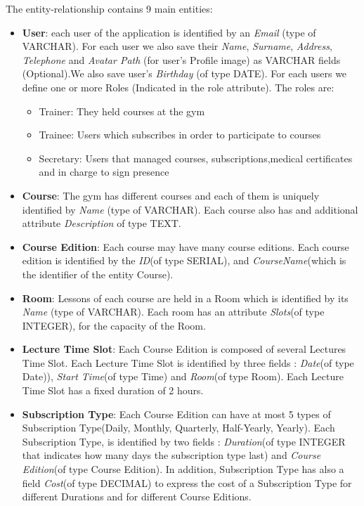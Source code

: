    The entity-relationship contains 9 main entities:
    \begin{itemize}
        \item 
        \textbf{User}: each user of the application is identified by an \textit{Email} (type of VARCHAR). 
    	For each user we also save their \textit{Name}, \textit{Surname}, \textit{Address}, \textit{Telephone} and \textit{Avatar Path} (for user's Profile image) as VARCHAR fields (Optional).We also save user's \textit{Birthday} (of type DATE). For each users we define
        one or more Roles (Indicated in the role attribute). The roles are:
        \begin{itemize}
			\item Trainer: They held courses at the gym 
			\item Trainee: Users which subscribes in order to participate to courses
			\item Secretary: Users that managed courses, subscriptions,medical certificates and in charge to sign presence
        \end{itemize}
    	
    	\item \textbf{Course}: The gym has different courses and each of them is uniquely identified by \textit{Name} (type of VARCHAR). Each course also has and additional attribute \textit{Description} of type TEXT.
    	
    	\item \textbf{Course Edition}: Each course may have many course editions. Each course edition is identified by the \textit{ID}(of type SERIAL), and \textit{CourseName}(which is the identifier of the entity Course).
    	
    	\item \textbf{Room}: Lessons of each course are held in a Room which is identified by its \textit{Name} (type of VARCHAR). Each room has an attribute \textit{Slots}(of type INTEGER), for the capacity of the Room.
    	
    	\item \textbf{Lecture Time Slot}: Each Course Edition is composed of several Lectures Time Slot. Each Lecture Time Slot is identified by three fields : \textit{Date}(of type Date)), \textit{Start Time}(of type Time) and \textit{Room}(of type Room). Each Lecture Time Slot has a fixed duration of 2 hours.
    	
    	\item \textbf{Subscription Type}: Each Course Edition can have at most 5 types of Subscription Type(Daily, Monthly, Quarterly, Half-Yearly, Yearly). Each Subscription Type, is identified by two fields : \textit{Duration}(of type INTEGER that indicates how many days the subscription type last) and \textit{Course Edition}(of type Course Edition). In addition, Subscription Type has also a field \textit{Cost}(of type DECIMAL) to express the cost of a Subscription Type for different Durations and for different Course Editions.
    	

\end{itemize}
